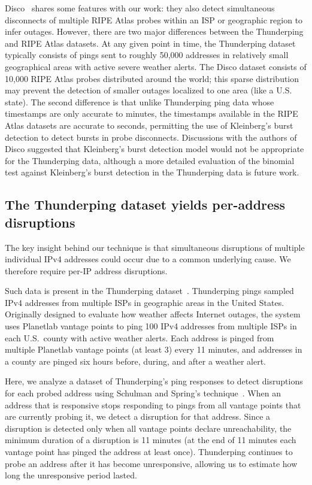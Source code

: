 Disco~\cite{disco} shares some features with our
work: they also detect simultaneous disconnects of multiple RIPE Atlas
probes within an ISP or geographic region to infer outages. However,
there are two major differences between the Thunderping and RIPE Atlas
datasets. At any given point in time, the Thunderping dataset
typically consists of pings sent to roughly
50,000 addresses in relatively small geographical areas with active severe weather
alerts. The Disco dataset consists of 10,000 RIPE Atlas probes
distributed around the world; this sparse distribution may prevent the
detection of smaller outages localized to one area (like a U.S. state). The second difference is that unlike
Thunderping ping data whose timestamps are only accurate to minutes,
the timestamps available in the RIPE Atlas datasets are accurate to
seconds, permitting the use of Kleinberg's burst detection to detect
bursts in probe disconnects. Discussions with the authors of Disco
suggested that Kleinberg's burst detection model would not be
appropriate for the Thunderping data, although a more detailed
evaluation of the binomial test against Kleinberg's burst
detection in the Thunderping data is future work.

\subsection{The Thunderping dataset yields per-address disruptions}

The key insight behind our technique is that simultaneous disruptions of
multiple individual IPv4 addresses could occur due to a common
underlying cause. We therefore require per-IP
address disruptions.

Such data is present in the Thunderping dataset~\cite{pingin}. Thunderping pings
sampled IPv4 addresses from multiple ISPs in geographic areas in the United
States. Originally designed to evaluate how weather affects Internet
outages, the system uses Planetlab vantage points to ping 100 IPv4
addresses from multiple ISPs in each U.S.~county with active
weather alerts. Each address is pinged from multiple Planetlab vantage
points (at least 3) every 11 minutes, and addresses in a county are
pinged six hours before, during, and after a weather alert. 

Here, we analyze a dataset of Thunderping's ping responses to detect
disruptions for each probed address using Schulman and Spring's
technique~\cite{pingin}. When an address that is responsive stops
responding to pings from all vantage points that are currently probing
it, we detect a disruption for that address. Since a disruption is
detected only when all vantage points declare unreachability, the
minimum duration of a disruption is 11 minutes (at the end of 11
minutes each vantage point has pinged the address at least
once). Thunderping continues to probe an address after it has become
unresponsive, allowing us to estimate how long the unresponsive period
lasted.

